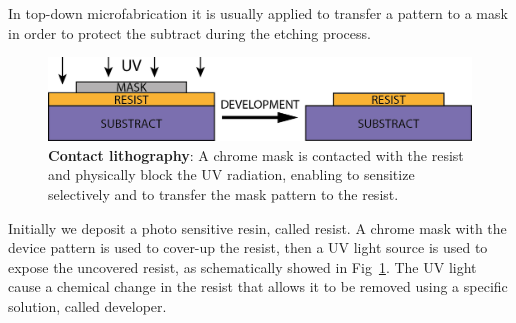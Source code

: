 In top-down microfabrication it is usually applied to transfer a pattern to a mask in order to protect the subtract during the etching process. 
\begin{figure}[!h]
    \centering
    \includegraphics[width = 16cm]{figuras/Dissertation_litho.jpg}
    \caption{\textbf{Contact lithography}: A chrome mask is contacted with the resist and physically block the UV radiation, enabling to sensitize selectively and to transfer the mask pattern to the resist.}
    \label{fig:litho}
\end{figure}

Initially we deposit a photo sensitive resin, called resist. A chrome mask with the device pattern is used to cover-up the resist, then a UV light source is used to expose the uncovered resist, as schematically showed in Fig~\ref{fig:litho}. The UV light cause a chemical change in the resist that allows it to be removed using a specific solution, called developer. 

